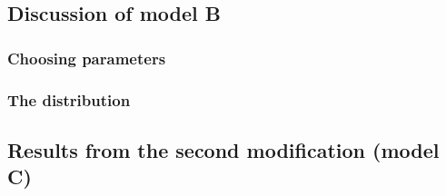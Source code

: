 \documentclass[a4paper, 10pt]{article}
\begin{document}
\subsection{Discussion of model B}
\subsubsection{Choosing parameters}

\subsubsection{The distribution}

\subsection{Results from the second modification (model C)}
\end{document}
